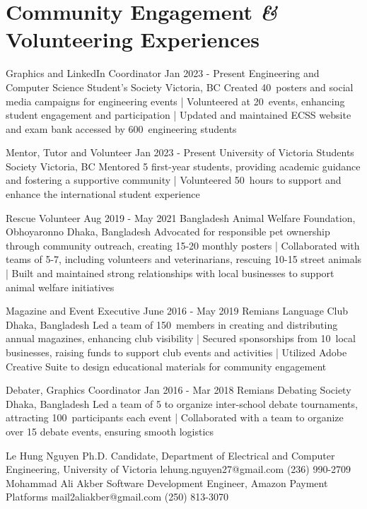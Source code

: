 \documentclass[a4paper,10pt]{article}
\begin{document}
\section{Community Engagement \textit{\&} Volunteering Experiences}

\volunteeringexperiences
{Graphics and LinkedIn Coordinator}
{Jan 2023 - Present}
{Engineering and Computer Science Student’s Society}
{Victoria, BC}
{Created 40\plus\ posters and social media campaigns for engineering events 
| Volunteered at 20\plus\ events, enhancing student engagement and participation 
| Updated and maintained ECSS website and exam bank accessed by 600\plus\ engineering students
}

\volunteeringexperiences
{Mentor, Tutor and Volunteer}
{Jan 2023 - Present}
{University of Victoria Students Society}
{Victoria, BC}
{Mentored 5 first-year students, providing academic guidance and fostering a supportive community
| Volunteered 50\plus\ hours to support and enhance the international student experience 
}

\volunteeringexperiences
{Rescue Volunteer}
{Aug 2019 - May 2021}
{Bangladesh Animal Welfare Foundation, Obhoyaronno}
{Dhaka, Bangladesh}
{Advocated for responsible pet ownership through community outreach, creating 15-20 monthly posters 
| Collaborated with teams of 5-7, including volunteers and veterinarians, rescuing 10-15 street animals 
| Built and maintained strong relationships with local businesses to support animal welfare initiatives
}

\volunteeringexperiences
{Magazine and Event Executive}
{June 2016 - May 2019}
{Remians Language Club}
{Dhaka, Bangladesh}
{Led a team of 150\plus\ members in creating and distributing annual magazines, enhancing club visibility
| Secured sponsorships from 10\plus\ local businesses, raising funds to support club events and activities 
| Utilized Adobe Creative Suite to design educational materials for community engagement
}

\volunteeringexperiences
{Debater, Graphics Coordinator}
{Jan 2016 - Mar 2018}
{Remians Debating Society}
{Dhaka, Bangladesh}
{Led a team of 5 to organize inter-school debate tournaments, attracting 100\plus\ participants each event
| Collaborated with a team to organize over 15 debate events, ensuring smooth logistics 
}

\begin{references}
        {Le Hung Nguyen}
        {Ph.D. Candidate, Department of Electrical and}
        {Computer Engineering, University of Victoria}
        {lehung.nguyen27@gmail.com}
        {(236) 990-2709}
    \hfill
        {Mohammad Ali Akber}
        {Software Development Engineer,}
        {Amazon Payment Platforms}
        {mail2aliakber@gmail.com}
        {(250) 813-3070}
\end{references}
\end{document}

